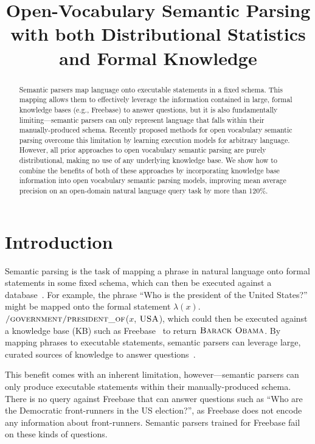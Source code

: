 \documentclass[11pt,letterpaper]{article}
\title{Open-Vocabulary Semantic Parsing\\with both Distributional
Statistics and Formal Knowledge}
\author{}%
\date{}
\newcommand{\formalpredicate}[1]{{\small \ensuremath{\textsc{#1}}}}
\begin{document}
\maketitle

\begin{abstract}

  Semantic parsers map language onto executable statements in a fixed schema.
  This mapping allows them to effectively leverage the information contained in
  large, formal knowledge bases (e.g., Freebase) to answer questions, but it is
  also fundamentally limiting---semantic parsers can only represent language
  that falls within their manually-produced schema.  Recently proposed methods
  for open vocabulary semantic parsing overcome this limitation by learning
  execution models for arbitrary language.  However, all prior approaches to
  open vocabulary semantic parsing are purely distributional, making no use of
  any underlying knowledge base.  We show how to combine the benefits of both
  of these approaches by incorporating knowledge base information into open
  vocabulary semantic parsing models, improving mean average precision on an
  open-domain natural language query task by more than 120\%.

\end{abstract}

\section{Introduction}

Semantic parsing is the task of mapping a phrase in natural language onto
formal statements in some fixed schema, which can then be executed against a
database~\cite{zelle-1996-geoquery,zettlemoyer-2005-ccg}.  For example, the
phrase ``Who is the president of the United States?'' might be mapped onto the
formal statement $\lambda(x).$\formalpredicate{/government/president\_of}($x$,
\formalpredicate{USA}), which could then be executed against a knowledge base
(KB) such as Freebase~\cite{freebase-2008-bollacker} to return
\formalpredicate{Barack Obama}.  By mapping phrases to executable statements,
semantic parsers can leverage large, curated sources of knowledge to answer
questions~\cite{berant-2013-semantic-parsing-qa}.

This benefit comes with an inherent limitation, however---semantic parsers can
only produce executable statements within their manually-produced schema.
There is no query against Freebase that can answer questions such as ``Who are
the Democratic front-runners in the US election?'', as Freebase does not encode
any information about front-runners.  Semantic parsers trained for Freebase
fail on these kinds of questions.
\end{document}
